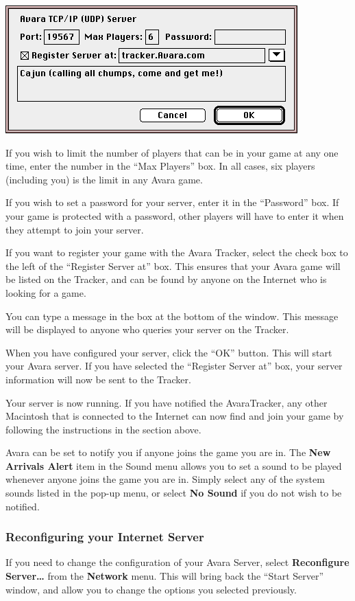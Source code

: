 \documentclass{article}
\begin{document}
\begin{center}
	\includegraphics{img/23.png}
\end{center}

If you wish to limit the number of players that can be in your game at any one time, enter the number in the ``Max Players'' box. In all cases, six players (including you) is the limit in any Avara game.

If you wish to set a password for your server, enter it in the ``Password'' box. If your game is protected with a password, other players will have to enter it when they attempt to join your server.

If you want to register your game with the Avara Tracker, select the check box to the left of the ``Register Server at'' box. This ensures that your Avara game will be listed on the Tracker, and can be found by anyone on the Internet who is looking for a game.

You can type a message in the box at the bottom of the window. This message will be displayed to anyone who queries your server on the Tracker.

When you have configured your server, click the ``OK'' button. This will start your Avara server. If you have selected the ``Register Server at'' box, your server information will now be sent to the Tracker.

Your server is now running. If you have notified the AvaraTracker, any other Macintosh that is connected to the Internet can now find and join your game by following the instructions in the section above.

Avara can be set to notify you if anyone joins the game you are in. The \textbf{New Arrivals Alert} item in the Sound menu allows you to set a sound to be played whenever anyone joins the game you are in. Simply select any of the system sounds listed in the pop-up menu, or select \textbf{No Sound} if you do not wish to be notified.

\subsubsection{Reconfiguring your Internet Server}
If you need to change the configuration of your Avara Server, select \textbf{Reconfigure Server\dots} from the \textbf{Network} menu. This will bring back the ``Start Server'' window, and allow you to change the options you selected previously.
\end{document}
